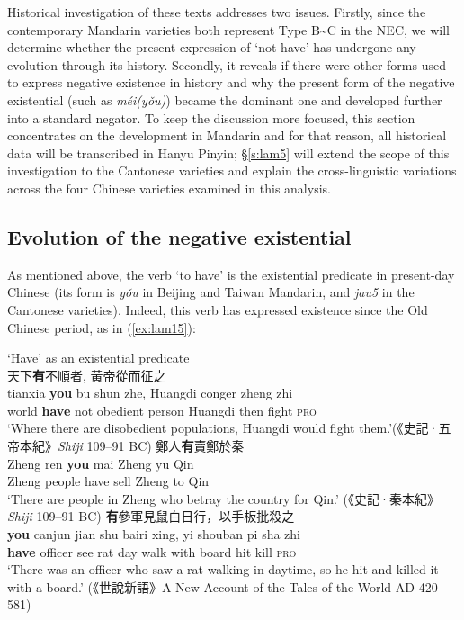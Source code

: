 \documentclass[output=paper]{langscibook}
\begin{document}
Historical investigation of these texts addresses two issues. Firstly, since the contemporary Mandarin varieties both represent Type B\sim C in the NEC, we will determine whether the present expression of `not have' has undergone any evolution through its history. Secondly, it reveals if there were other forms used to express negative existence in history and why the present form of the negative existential (such as \textit{méi(yǒu)}) became the dominant one and developed further into a standard negator. To keep the discussion more focused, this section concentrates on the development in Mandarin and for that reason, all historical data will be transcribed in Hanyu Pinyin; §\ref{s:lam5} will extend the scope of this investigation to the Cantonese varieties and explain the cross-linguistic variations across the four Chinese varieties examined in this analysis. 


\subsection{Evolution of the negative existential}\label{s:lam4-1}

As mentioned above, the verb `to have' is the existential predicate in present-day Chinese (its form is \textit{yǒu} in Beijing and Taiwan Mandarin, and \textit{jau5} in the Cantonese varieties). Indeed, this verb has expressed existence since the Old Chinese period, as in (\ref{ex:lam15}):

\ea `Have' as an existential predicate  \label{ex:lam15}\\
  \ea 天下\textbf{有}不順者, 黃帝從而征之 \label{ex:lam15a}\\
  	\gll tianxia \textbf{you} bu shun zhe, Huangdi conger zheng zhi\\
  	world \textbf{have} not obedient person Huangdi then fight \textsc{pro}\\
  	\glt `Where there are disobedient populations, Huangdi would fight them.'(《史記·五帝本紀》\emph{Shiji} 109–91 BC)  
  \ex 鄭人\textbf{有}賣鄭於秦 \label{ex:lam15b}\\
  	\gll Zheng ren \textbf{you}	mai	Zheng yu Qin\\
  	Zheng people have sell Zheng to Qin\\
  	\glt `There are people in Zheng who betray the country for Qin.' (《史記·秦本紀》\emph{Shiji} 109–91 BC)  
  \ex \textbf{有}參軍見鼠白日行，以手板批殺之 \label{ex:lam15c}\\
	\gll \textbf{you} canjun jian shu bairi xing, yi shouban pi sha zhi\\
	\textbf{have} officer see rat day walk with board hit kill \textsc{pro}\\
	\glt`There was an officer who saw a rat walking in daytime, so he hit and killed it with a board.' (《世說新語》A New Account of the Tales of the World AD 420–581)
\z \z 
\end{document}
